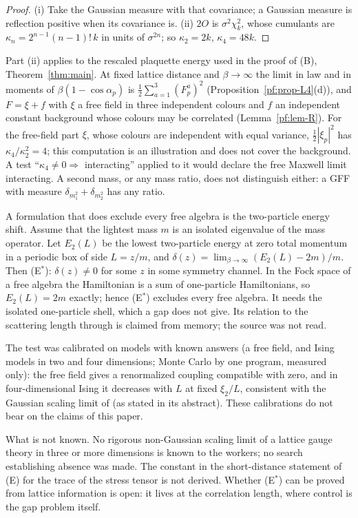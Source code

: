 \begin{proof}
(i) Take the Gaussian measure with that covariance; a Gaussian measure is reflection positive
when its covariance is. (ii) $2O$ is $\sigma^2\chi^2_k$, whose cumulants are
$\kappa_n=2^{n-1}(n-1)!\,k$ in units of $\sigma^{2n}$; so $\kappa_2=2k$, $\kappa_4=48k$.
\end{proof}

Part (ii) applies to the rescaled plaquette energy used in the proof of (B),
Theorem~\ref{thm:main}. At fixed lattice distance and
$\beta\to\infty$ the limit in law and in moments of $\beta(1-\cos\alpha_p)$ is
$\frac12\sum_{a=1}^3(F^a_p)^2$ (Proposition~\ref{pf:prop-L4}(d)), and $F=\xi+f$ with $\xi$ a free
field in three independent colours and $f$ an independent constant background whose colours may be
correlated (Lemma~\ref{pf:lem-R}). For the free-field part $\xi$, whose colours are independent
with equal variance, $\frac12|\xi_p|^2$ has $\kappa_4/\kappa_2^2=4$; this computation is an
illustration and does not cover the background. A test ``$\kappa_4\ne0\Rightarrow$ interacting'' applied to it would
declare the free Maxwell limit interacting. A second mass, or any mass ratio, does not
distinguish either: a GFF with measure $\delta_{m_1^2}+\delta_{m_2^2}$ has any ratio.

A formulation that does exclude every free algebra is the two-particle energy shift. Assume
that the lightest mass $m$ is an isolated eigenvalue of the mass operator. Let $E_2(L)$ be the
lowest two-particle energy at zero total momentum in a periodic box of side $L=z/m$, and
$\delta(z)=\lim_{\beta\to\infty}(E_2(L)-2m)/m$. Then (E$^*$): $\delta(z)\ne0$ for some $z$ in some
symmetry channel. In the Fock space of a free algebra the Hamiltonian is a sum of one-particle
Hamiltonians, so $E_2(L)=2m$ exactly; hence (E$^*$) excludes every free algebra. It needs the
isolated one-particle shell, which a gap does not give. Its relation to the scattering length
through \cite{LW86} is claimed from memory; the source was not read.

The test was calibrated on models with known answers (a free field, and Ising models in two and
four dimensions; Monte Carlo by one program, measured only): the free field gives a renormalized
coupling compatible with zero, and in four-dimensional Ising it decreases with $L$ at fixed
$\xi_2/L$, consistent with the Gaussian scaling limit of \cite{ADC21} (as stated in its abstract).
These calibrations do not bear on the claims of this paper.

What is not known. No rigorous non-Gaussian scaling limit of a lattice gauge theory in three or
more dimensions is known to the workers; no search establishing absence was made. The constant
in the short-distance statement of (E) for the trace of the stress tensor is not derived. Whether
(E$^*$) can be proved from lattice information is open: it lives at the correlation length,
where control is the gap problem itself.
